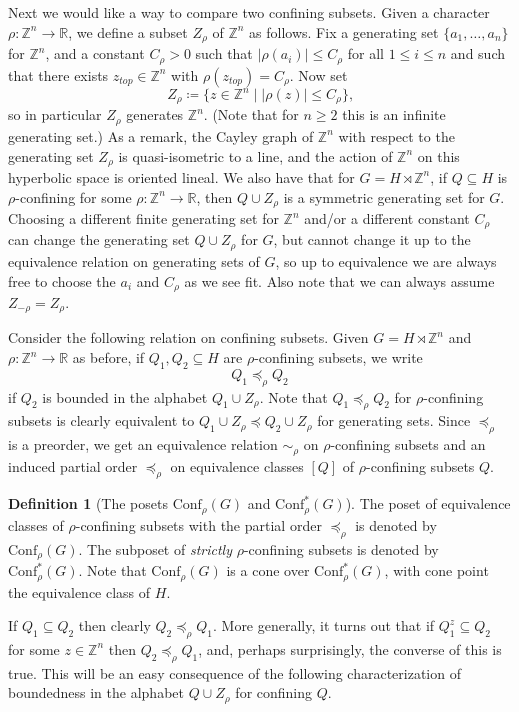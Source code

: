\documentclass[10pt,a4paper]{article}
\theoremstyle{definition}
\newtheorem{defi}[cdrthm]{Definition}
\theoremstyle{remark}
\newcommand{\Z}{\mathbb{Z}}
\newcommand{\R}{\mathbb{R}}
\newcommand{\Conf}{\mathrm{Conf}}
\theoremstyle{plain}
\begin{document}
Next we would like a way to compare two confining subsets. Given a character $\rho\colon \Z^n\to\R$, we define a subset $Z_\rho$ of $\Z^n$ as follows. Fix a generating set $\{a_1,\dots,a_n\}$ for $\Z^n$, and a constant $C_\rho>0$ such that $|\rho(a_i)| \leq C_\rho$ for all $1\le i\le n$ and such that there exists $z_{top}\in \Z^n$ with $\rho(z_{top})=C_\rho$. Now set
\[
Z_\rho \coloneqq \{z\in\Z^n \mid |\rho(z)|\le C_\rho\}\text{,}
\]
so in particular $Z_\rho$ generates $\Z^n$. (Note that for $n\ge 2$ this is an infinite generating set.) As a remark, the Cayley graph of $\Z^n$ with respect to the generating set $Z_\rho$ is quasi-isometric to a line, and the action of $\Z^n$ on this hyperbolic space is oriented lineal. We also have that for $G=H\rtimes \Z^n$, if $Q\subseteq H$ is $\rho$-confining for some $\rho\colon \Z^n\to\R$, then $Q\cup Z_\rho$ is a symmetric generating set for $G$. Choosing a different finite generating set for $\Z^n$ and/or a different constant $C_\rho$ can change the generating set $Q\cup Z_\rho$ for $G$, but cannot change it up to the equivalence relation on generating sets of $G$, so up to equivalence we are always free to choose the $a_i$ and $C_\rho$ as we see fit. Also note that we can always assume $Z_{-\rho}=Z_\rho$.

Consider the following relation on confining subsets. Given $G=H\rtimes \Z^n$ and $\rho\colon\Z^n\to\R$ as before, if $Q_1,Q_2\subseteq H$ are $\rho$-confining subsets, we write
\[
Q_1\preceq_\rho Q_2
\]
if $Q_2$ is bounded in the alphabet $Q_1\cup Z_\rho$. Note that $Q_1\preceq_\rho Q_2$ for $\rho$-confining subsets is clearly equivalent to $Q_1\cup Z_\rho\preceq Q_2\cup Z_\rho$ for generating sets. Since $\preceq_\rho$ is a preorder, we get an equivalence relation $\sim_\rho$ on $\rho$-confining subsets and an induced partial order $\preccurlyeq_\rho$ on equivalence classes $[Q]$ of $\rho$-confining subsets $Q$.

\begin{defi}[The posets $\Conf_\rho(G)$ and $\Conf^\ast_\rho(G)$]\label{def:conf_poset}
The poset of equivalence classes of $\rho$-confining subsets with the partial order $\preccurlyeq_\rho$ is denoted by $\Conf_\rho(G)$. The subposet of \emph{strictly} $\rho$-confining subsets is denoted by $\Conf^\ast_\rho(G)$. Note that $\Conf_\rho(G)$ is a cone over $\Conf^\ast_\rho(G)$, with cone point the equivalence class of $H$.
\end{defi}

If $Q_1 \subseteq Q_2$ then clearly $Q_2 \preceq_\rho Q_1$. More generally, it turns out that if $Q_1^z \subseteq Q_2$ for some $z\in \Z^n$ then $Q_2 \preceq_\rho Q_1$, and, perhaps surprisingly, the converse of this is true. This will be an easy consequence of the following characterization of boundedness in the alphabet $Q\cup Z_\rho$ for confining $Q$.
\end{document}
